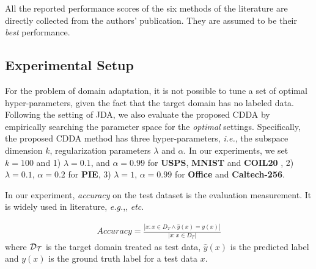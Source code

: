 \documentclass[10pt,twocolumn,letterpaper]{article}
\begin{document}
\begin{CJK*}{UTF8}{gkai}
All the reported performance scores of the six methods of the literature are directly collected from the authors' publication. They are assumed to be their \emph{best} performance.
% 
% 
% 


\subsection{Experimental Setup}
For the problem of domain adaptation, it is not possible to tune a set of optimal hyper-parameters, given the fact that the target domain has no labeled data. Following the setting of JDA, we also evaluate the proposed CDDA by empirically searching the parameter space for the \emph{optimal} settings. Specifically, the proposed CDDA method has three hyper-parameters, \textit{i.e.}, the subspace dimension $k$, regularization parameters $\lambda $ and $\alpha $. In  our experiments, we set $k = 100$ and 1) $\lambda  = 0.1$, and $\alpha  = 0.99$ for \textbf{USPS}, \textbf{MNIST} and \textbf{COIL20} , 2) $\lambda  = 0.1$, $\alpha  = 0.2$ for \textbf{PIE}, 3) $\lambda  = 1$, $\alpha  = 0.99$ for \textbf{Office} and \textbf{Caltech-256}.

In our experiment, {\emph{accuracy}}  on the test dataset is the evaluation measurement. It is widely used in literature, \textit{e.g.},\cite{pan2008transfer,long2013transfer,long2015learning}, \textit{etc}.

\begin{equation}\label{eq:accuracy}
	\begin{array}{c}
		Accuracy = \frac{{\left| {x:x \in {D_T} \wedge \hat y(x) = y(x)} \right|}}{{\left| {x:x \in {D_T}} \right|}}
	\end{array}
\end{equation}
where ${\cal{D_T}}$ is the target domain treated as test data, ${\hat{y}(x)}$ is the predicted label and ${y(x)}$ is the ground truth label for a test data  $x$.


\end{CJK*}
\end{document}
